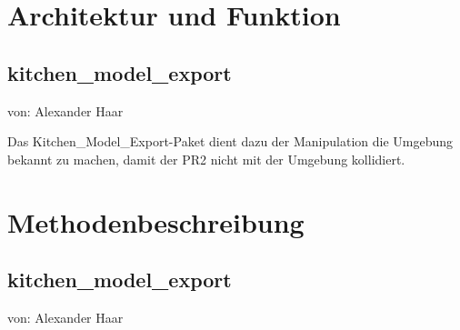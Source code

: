 \documentclass{suturo}
\begin{document}

\makeatletter
\newcommand{\chapterauthor}[1]{%
  {\parindent0pt\vspace*{-47pt}%
  \linespread{2.2}\large\begin{flushright}von: #1\end{flushright}%
  \par\nobreak\vspace*{0pt}}
  \@afterheading%
}
\makeatother

\section{Architektur und Funktion}
\subsection{kitchen\_model\_export}
\chapterauthor{Alexander Haar}
Das Kitchen\_Model\_Export-Paket dient dazu der Manipulation die Umgebung bekannt zu machen, damit der PR2 nicht mit der Umgebung kollidiert.

\begin{figure}[!htb]
\end{figure}
      
\section{Methodenbeschreibung}
\subsection{kitchen\_model\_export}
\chapterauthor{Alexander Haar}
\end{document}
